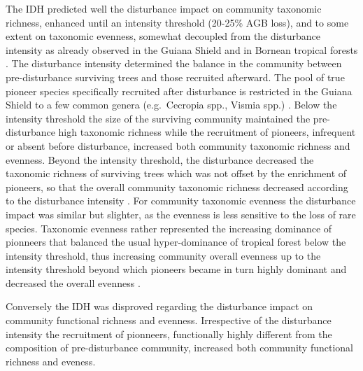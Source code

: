 \documentclass[fleqn,10pt]{ArtEcoFoG} %
\begin{document}
The IDH predicted well the disturbance impact on community taxonomic
richness, enhanced until an intensity threshold (20-25\% AGB loss), and
to some extent on taxonomic evenness, somewhat decoupled from the
disturbance intensity as already observed in the Guiana Shield
\citep{Baraloto2012a} and in Bornean tropical forests
\citep{Cannon1998}. The disturbance intensity determined the balance in
the community between pre-disturbance surviving trees and those
recruited afterward. The pool of true pioneer species specifically
recruited after disturbance is restricted in the Guiana Shield to a few
common genera (e.g.~Cecropia spp., Vismia spp.)
\citep{Zalamea2012, Guitet2018}. Below the intensity threshold the size
of the surviving community maintained the pre-disturbance high taxonomic
richness while the recruitment of pioneers, infrequent or absent before
disturbance, increased both community taxonomic richness and evenness.
Beyond the intensity threshold, the disturbance decreased the taxonomic
richness of surviving trees which was not offset by the enrichment of
pioneers, so that the overall community taxonomic richness decreased
according to the disturbance intensity \citep{Molino2001}. For community
taxonomic evenness the disturbance impact was similar but slighter, as
the evenness is less sensitive to the loss of rare species. Taxonomic
evenness rather represented the increasing dominance of pionneers that
balanced the usual hyper-dominance of tropical forest below the
intensity threshold, thus increasing community overall evenness up to
the intensity threshold beyond which pioneers became in turn highly
dominant and decreased the overall evenness \citep{Baraloto2012a}.

Conversely the IDH was disproved regarding the disturbance impact on
community functional richness and evenness. Irrespective of the
disturbance intensity the recruitment of pionneers, functionally highly
different from the composition of pre-disturbance community, increased
both community functional richness and eveness.
\end{document}
